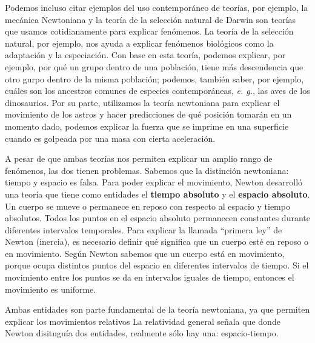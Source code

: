 \documentclass[12pt]{article}
\begin{document}
Podemos incluso citar ejemplos del uso contemporáneo de teorías, por ejemplo, la mecánica Newtoniana y la teoría de la selección natural de Darwin son teorías que usamos cotidianamente para explicar fenómenos. La teoría de la selección natural, por ejemplo, nos ayuda a explicar fenómenos biológicos como la adaptación y la especiación. Con base en esta teoría, podemos explicar, por ejemplo, por qué un grupo dentro de una población, tiene más descendencia que otro gurpo dentro de la misma población; podemos, también saber, por ejemplo, cuáles son los ancestros comunes de especies contemporáneas, \textit{e. g.}, las aves de los dinosaurios. Por su parte, utilizamos la teoría newtoniana para explicar el movimiento de los astros y hacer predicciones de qué posición tomarán en un momento dado, podemos explicar la fuerza que se imprime en una superficie cuando es golpeada por una masa con cierta aceleración.

A pesar de que ambas teorías nos permiten explicar un amplio rango de fenómenos, las dos tienen problemas. Sabemos que la distinción newtoniana: tiempo y espacio es falsa. Para poder explicar el movimiento, Newton desarrolló una teoría que tiene como entidades el \textbf{tiempo absoluto} y el \textbf{espacio absoluto}. Un cuerpo se mueve o permanece en reposo con respecto al espacio y tiempo absolutos. Todos los puntos en el espacio absoluto permanecen constantes durante diferentes intervalos temporales. Para explicar la llamada ``primera ley''  de Newton (inercia), es necesario definir qué significa que un cuerpo esté en reposo o en movimiento. Según Newton sabemos que un cuerpo está en movimiento, porque ocupa distintos puntos del espacio en diferentes intervalos de tiempo. Si el movimiento entre los puntos se da en intervalos iguales de tiempo, entonces el movimiento es uniforme. 


Ambas entidades son parte fundamental de la teoría newtoniana, ya que permiten explicar los movimientos relativos \cite{Maudlin2014Filosofia:7985} La relatividad general señala que donde Newton disitnguía dos entidades, realmente sólo hay una: espacio-tiempo. 
\end{document}
